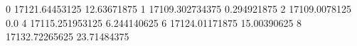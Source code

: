 0 17121.64453125 12.63671875
1 17109.302734375 0.294921875
2 17109.0078125 0.0
4 17115.251953125 6.244140625
6 17124.01171875 15.00390625
8 17132.72265625 23.71484375
